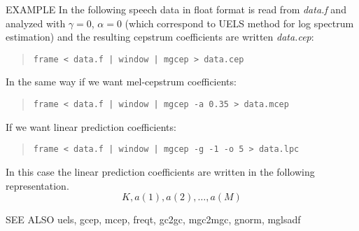 \newpage
\begin{options}
\end{options}

\begin{qsection}{EXAMPLE}
In the following speech data in float format is read
from {\em data.f} and analyzed with $\gamma=0$, $\alpha=0$
(which correspond to UELS method for log spectrum estimation)
and the resulting cepstrum coefficients are written {\em data.cep}:
\begin{quote}
  \verb!frame < data.f | window | mgcep > data.cep !
\end{quote}
\par
In the same way if we want mel-cepstrum coefficients:
\begin{quote}
 \verb!frame < data.f | window | mgcep -a 0.35 > data.mcep !
\end{quote}
\par
If we want linear prediction coefficients:
\begin{quote}
  \verb!frame < data.f | window | mgcep -g -1 -o 5 > data.lpc !
\end{quote}
In this case the linear prediction coefficients are written
in the following representation.
\begin{displaymath}
  K, a(1), a(2), \ldots, a(M)
\end{displaymath}
\end{qsection}

\begin{qsection}{SEE ALSO}
 uels, gcep, mcep, freqt, gc2gc, mgc2mgc, gnorm, mglsadf
\end{qsection}

